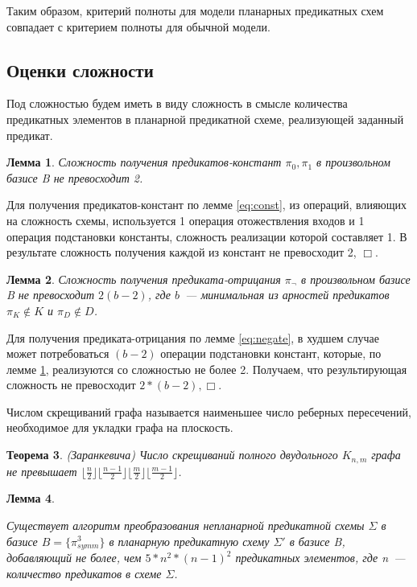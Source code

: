 \documentclass[12pt]{extarticle}
\newtheorem{theorem}{Теорема}[section]
\newtheorem{lemma}[theorem]{Лемма}
\newenvironment{proof}[1][Доказательство.]{\begin{trivlist}
\item[\hskip \labelsep {\bfseries #1}]}{\end{trivlist}}
\newenvironment{definition}[1][Определение.]{\begin{trivlist}
\item[\hskip \labelsep {\bfseries #1}]}{\end{trivlist}}
\begin{document}
Таким образом, критерий полноты для модели планарных предикатных схем совпадает с критерием полноты для обычной модели.

\subsection{Оценки сложности}
Под сложностью будем иметь в виду сложность в смысле количества предикатных элементов в планарной предикатной схеме, 
реализующей заданный предикат.
\begin{lemma}
\label{corol:const}
Сложность получения предикатов-констант $\pi_0, \pi_1$ в произвольном базисе B не превосходит 2.
\end{lemma}
\begin{proof}
Для получения предикатов-констант по лемме \ref{eq:const}, из операций, влияющих на сложность схемы, используется
1 операция отожествления входов и 1 операция подстановки константы, сложность реализации которой составляет 1.
В результате сложность получения каждой из констант не превосходит 2, $\Box$.
\end{proof}

\begin{lemma}
\label{corol:negate}
Сложность получения предиката-отрицания $\pi_{\neg}$ в произвольном базисе B не превосходит $2(b-2)$, 
где $b$~--- минимальная из арностей предикатов $\pi_K \notin K$ и $\pi_D \notin D$.
\end{lemma}
\begin{proof}
Для получения предиката-отрицания по лемме \ref{eq:negate}, в худшем случае может потребоваться $(b-2)$ операции 
подстановки констант, которые, по лемме \ref{corol:const}, реализуются со сложностью не более 2. Получаем, 
что результирующая сложность не превосходит $2*(b-2), \Box$.
\end{proof}

\begin{definition}
Числом скрещиваний графа называется наименьшее число реберных пересечений, необходимое для укладки графа на плоскость.
\end{definition}

\begin{theorem}
\label{ZarankTheorem}
(Заранкевича) Число скрещиваний полного двудольного $K_{n,m}$ графа не превышает
$\lfloor \frac{n}{2} \rfloor \lfloor \frac{n-1}{2} \rfloor \lfloor \frac{m}{2} \rfloor \lfloor \frac{m-1}{2} \rfloor$.
\cite{Zarank54}
\end{theorem}

\begin{lemma}
\label{eq:planar_algo_complexity}

Существует алгоритм преобразования непланарной предикатной схемы $\Sigma$ в базисе $B=\{\pi_{symm}^3\}$
в планарную предикатную схему $\Sigma'$ в базисе B, добавляющий не более, чем 
$5 * n^2*(n-1)^2 $ предикатных элементов, где n~--- количество предикатов в схеме $\Sigma$.
\end{lemma}
\end{document}
